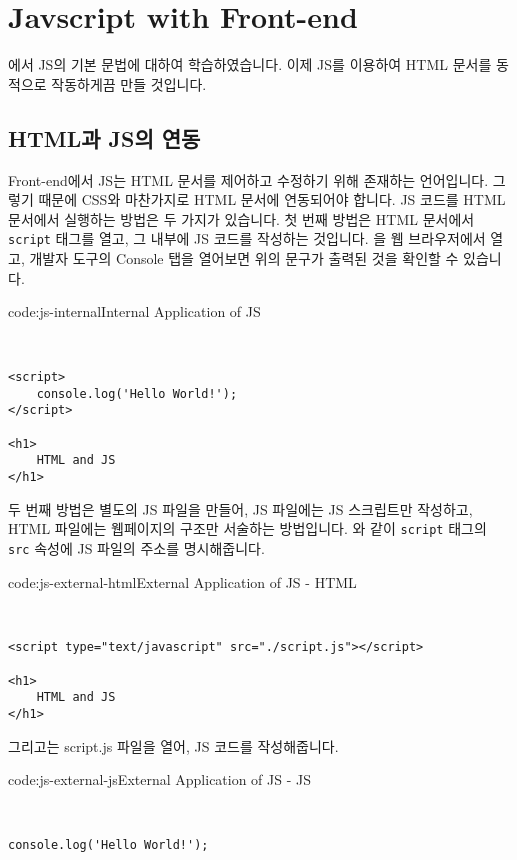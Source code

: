 \section{Javscript with Front-end} \label{sect:javascript-with-front-end}

에서 JS의 기본 문법에 대하여 학습하였습니다. 이제 JS를 이용하여 HTML 문서를 동적으로 작동하게끔 만들 것입니다. 

\subsection*{HTML과 JS의 연동}

Front-end에서 JS는 HTML 문서를 제어하고 수정하기 위해 존재하는 언어입니다. 그렇기 때문에 CSS와 마찬가지로 HTML 문서에 연동되어야 합니다. JS 코드를 HTML 문서에서 실행하는 방법은 두 가지가 있습니다. 첫 번째 방법은 HTML 문서에서 \texttt{script} 태그를 열고, 그 내부에 JS 코드를 작성하는 것입니다. 을 웹 브라우저에서 열고, 개발자 도구의 Console 탭을 열어보면 위의 문구가 출력된 것을 확인할 수 있습니다. 

\begin{codeenv}{code:js-internal}{Internal Application of JS}\begin{verbatim}


<script>
    console.log('Hello World!');
</script>

<h1>
    HTML and JS
</h1>
\end{verbatim}
\end{codeenv}

두 번째 방법은 별도의 JS 파일을 만들어, JS 파일에는 JS 스크립트만 작성하고, HTML 파일에는 웹페이지의 구조만 서술하는 방법입니다. 와 같이 \texttt{script} 태그의 \texttt{src} 속성에 JS 파일의 주소를 명시해줍니다. 

\begin{codeenv}{code:js-external-html}{External Application of JS - HTML}\begin{verbatim}


<script type="text/javascript" src="./script.js"></script>

<h1>
    HTML and JS
</h1>
\end{verbatim}
\end{codeenv}

그리고는 script.js 파일을 열어, JS 코드를 작성해줍니다. 

\begin{codeenv}{code:js-external-js}{External Application of JS - JS}\begin{verbatim}


console.log('Hello World!');
\end{verbatim}
\end{codeenv}

